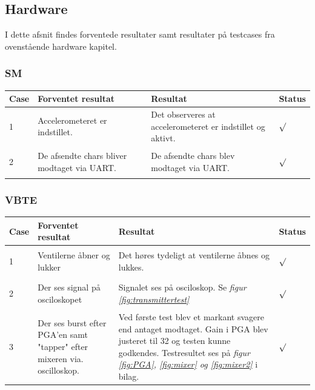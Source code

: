 \subsection{Hardware}
I dette afsnit findes forventede resultater samt resultater på testcases fra ovenstående hardware kapitel.\\
\subsubsection{SM}
\begin{table}[H]
\centering
\begin{tabular}{| p{1cm}  | p{4cm} | p{6cm} | p{1cm} |}
\hline
Case &Forventet resultat &Resultat &Status\\\hline
1 &Accelerometeret er indstillet. &Det observeres at accelerometeret er indstillet og aktivt. &\begin{Huge}$\surd$\end{Huge}\\\hline
2 &De afsendte chars bliver modtaget via UART. &De afsendte chars blev modtaget via UART. &\begin{Huge}$\surd$\end{Huge}\\\hline
\end{tabular}
\end{table}
\subsubsection{VBTE}
\begin{table}[H]
\centering
\begin{tabular}{| p{1cm}  | p{4cm} | p{6cm} | p{1cm} |}
\hline
Case &Forventet resultat &Resultat &Status\\\hline
1 &Ventilerne åbner og lukker &Det høres tydeligt at ventilerne åbnes og lukkes. &\begin{Huge}$\surd$\end{Huge} \\\hline 
2 &Der ses signal på osciloskopet &Signalet ses på osciloskop. Se \textit{figur \ref{fig:transmittertest}} &\begin{Huge}$\surd$\end{Huge} \\\hline 
3 & Der ses burst efter PGA'en samt "tapper" efter mixeren via. oscilloskop. & Ved første test blev et markant svagere end antaget modtaget. Gain i PGA blev justeret til 32 og testen kunne godkendes. Testresultet ses på \textit{figur \ref{fig:PGA}, \ref{fig:mixer} og \ref{fig:mixer2}} i bilag. &\begin{Huge}$\surd$\end{Huge} \\\hline 
\end{tabular}
\end{table}
